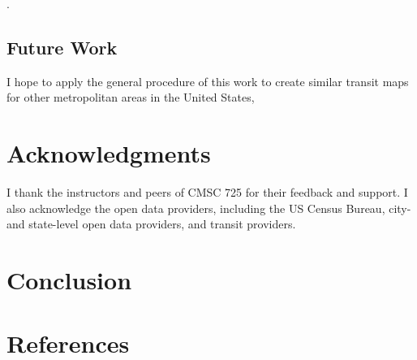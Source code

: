 \documentclass[manuscript]{acmart}
\begin{document}
\cite{bib:bast2016route, bib:chien2001genetic}.

\subsection{Future Work}

I hope to apply the general procedure of this work to create similar transit maps for other metropolitan areas in the United States, 


\section{Acknowledgments}

I thank the instructors and peers of CMSC 725 for their feedback and support. I also acknowledge the open data providers, including the US Census Bureau, city- and state-level open data providers, and transit providers.

\section{Conclusion}

\section{References}



\end{document}

